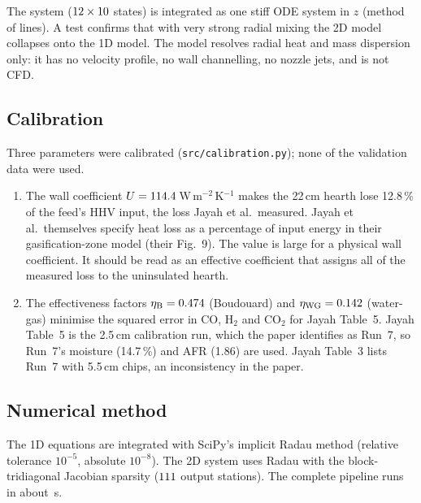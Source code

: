\documentclass[11pt,a4paper]{article}
\begin{document}
The system ($12\times10$ states) is integrated as one stiff ODE system in $z$ (method of lines). A test confirms that with very strong radial mixing the 2D model collapses onto the 1D model. The model resolves radial heat and mass dispersion only: it has no velocity profile, no wall channelling, no nozzle jets, and is not CFD.

\subsection{Calibration}\label{sec:cal}
Three parameters were calibrated (\texttt{src/calibration.py}); none of the validation data were used.
\begin{enumerate}
\item The wall coefficient $U=114.4$\,W\,m$^{-2}$\,K$^{-1}$ makes the 22\,cm hearth lose 12.8\,\% of the feed's HHV input, the loss Jayah et al.\ measured. Jayah et al.\ themselves specify heat loss as a percentage of input energy in their gasification-zone model (their Fig.~9). The value is large for a physical wall coefficient. It should be read as an effective coefficient that assigns all of the measured loss to the uninsulated hearth.
\item The effectiveness factors $\eta_\text{B}=0.474$ (Boudouard) and $\eta_\text{WG}=0.142$ (water-gas) minimise the squared error in CO, H$_2$ and CO$_2$ for Jayah Table~5. Jayah Table~5 is the 2.5\,cm calibration run, which the paper identifies as Run~7, so Run~7's moisture (14.7\,\%) and AFR (1.86) are used. Jayah Table~3 lists Run~7 with 5.5\,cm chips, an inconsistency in the paper.
\end{enumerate}

\subsection{Numerical method}
The 1D equations are integrated with SciPy's implicit Radau method (relative tolerance $10^{-5}$, absolute $10^{-8}$). The 2D system uses Radau with the block-tridiagonal Jacobian sparsity ($111$ output stations). The complete pipeline runs in about \RRuntime\,s.

\end{document}
